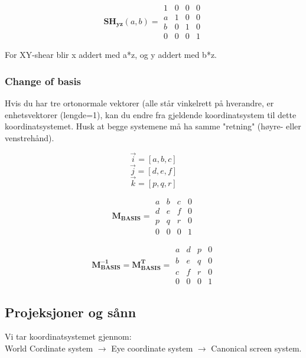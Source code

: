 \begin{equation}
    \boldsymbol{SH_{yz}}(a,b) =
    \begin{matrix}
        1 & 0 & 0 & 0\\
        a & 1 & 0 & 0\\
        b & 0 & 1 & 0\\
        0 & 0 & 0 & 1
    \end{matrix}
\end{equation}

For XY-shear blir x addert med a*z, og y addert med b*z.




\subsubsection{Change of basis}
Hvis du har tre ortonormale vektorer (alle står vinkelrett på hverandre, er enhetsvektorer (lengde=1), kan du endre fra gjeldende koordinatsystem til dette koordinatsystemet. Husk at begge systemene må ha samme "retning" (høyre- eller venstrehånd).

$$ \vec{i} = [a, b, c] $$
$$ \vec{j} = [d, e, f] $$
$$ \vec{k} = [p, q, r] $$

\begin{equation} \label{eq:basis_matrix}
    \boldsymbol{M_{BASIS}}=
    \begin{matrix}
        a & b & c & 0 \\
        d & e & f & 0 \\
        p & q & r & 0 \\
        0 & 0 & 0 & 1
    \end{matrix}
\end{equation}

\begin{equation}
    \boldsymbol{M^{-1}_{BASIS}} = \boldsymbol{M_{BASIS}^T} =
    \begin{matrix}
        a & d & p & 0 \\
        b & e & q & 0 \\
        c & f & r & 0 \\
        0 & 0 & 0 & 1
    \end{matrix}
\end{equation}

\subsection{Projeksjoner og sånn}
Vi tar koordinatsystemet gjennom: \\
World Cordinate system $\rightarrow$ Eye coordinate system $\rightarrow$ Canonical screen system.
